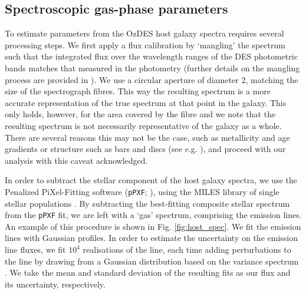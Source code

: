 \documentclass[fleqn,usenatbib,]{mnras}
\newcommand{\replychris}[1]{\color{magenta}#1 \color{black}}
\newcommand{\replylluis}[1]{\color{green}#1 \color{black}}
\begin{document}
\subsection{Spectroscopic gas-phase parameters \label{subsec:linefit}}

To estimate parameters from the OzDES host galaxy spectra requires several processing steps. We first apply a flux calibration by `mangling' the spectrum such that the integrated flux over the wavelength ranges of the DES photometric bands matches that measured in the photometry (further details on the mangling process are provided in \citealt{Swann2020}). We use a circular aperture of diameter 2\arcsec, matching the size of the spectrograph fibres. \replylluis{This way the resulting spectrum is a more accurate representation of the true spectrum at that point in the galaxy. This only holds, however, for the area covered by the fibre and we note that the resulting spectrum is not necessarily representative of the galaxy as a whole. There are several reasons this may not be the case, such as metallicity and age gradients or structure such as bars and discs (see e.g. \citealt{Iglesias-Paramo2013,Iglesias-Paramo2016}), and proceed with our analysis with this caveat acknowledged.}

In order to subtract the stellar component of the host galaxy spectra, we use the Penalized PiXel-Fitting software (\texttt{pPXF}; \citealt{Cappellari2004,Cappellari2012,Cappellari2017}), using the MILES library of single stellar populations \citep{Vazdekis2010}. By subtracting the best-fitting composite stellar spectrum from the \texttt{pPXF} fit, we are left with a `gas' spectrum, comprising the emission lines. An example of this procedure is shown in Fig. \ref{fig:host_spec}. We fit the emission lines with Gaussian profiles. In order to estimate the uncertainty on the emission line fluxes, we fit $10^4$ realisations of the line, each time adding perturbations to the line by drawing from a Gaussian distribution \replychris{based on the variance spectrum}. We take the mean and standard deviation of the resulting fits as our flux and its uncertainty, respectively.
\end{document}
